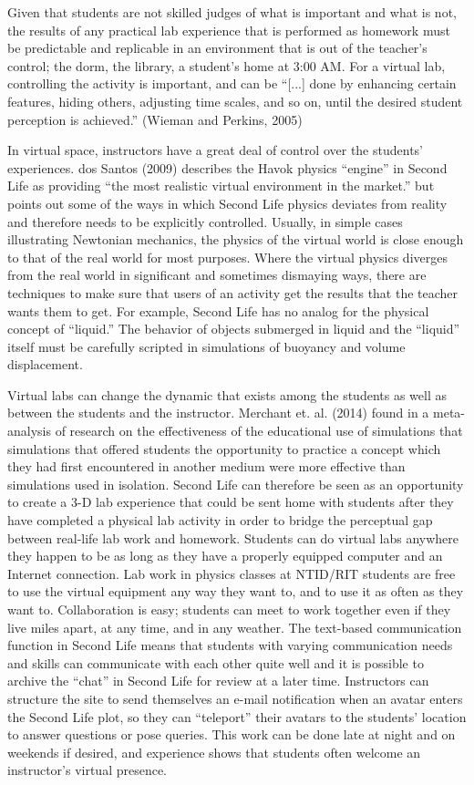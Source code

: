 \documentclass[11.5pt]{sig-alternate} %
\begin{document}
\begin{large}
Given that students are not skilled judges of what is important and what is not, the results of any practical lab experience that is performed as homework must be predictable and replicable in an environment that is out of the teacher’s control; the dorm, the library, a student’s home at 3:00 AM. For a virtual lab, controlling the activity is important, and can be “[...] done by enhancing certain features, hiding others, adjusting time scales, and so on, until the desired student perception is achieved.” (Wieman and Perkins, 2005)

In virtual space, instructors have a great deal of control over the students’ experiences. dos Santos (2009) describes the Havok physics “engine” in Second Life as providing “the most realistic virtual environment in the market.” but points out some of the ways in which Second Life physics deviates from reality and therefore needs to be explicitly controlled. Usually, in simple cases illustrating Newtonian mechanics, the physics of the virtual world is close enough to that of the real world for most purposes. Where the virtual physics diverges from the real world in significant and sometimes dismaying ways, there are techniques to make sure that users of an activity get the results that the teacher wants them to get. For example, Second Life has no analog for the physical concept of “liquid.” The behavior of objects submerged in liquid and the “liquid” itself must be carefully scripted in simulations of buoyancy and volume displacement.

Virtual labs can change the dynamic that exists among the students as well as between the students and the instructor. Merchant et. al. (2014) found in a meta-analysis of research on the effectiveness of the educational use of simulations that simulations that offered students the opportunity to practice a concept which they had first encountered in another medium were more effective than simulations used in isolation. Second Life can therefore be seen as an opportunity to create a 3-D lab experience that could be sent home with students after they have completed a physical lab activity in order to bridge the perceptual gap between real-life lab work and homework. Students can do virtual labs anywhere they happen to be as long as they have a properly equipped computer and an Internet connection. Lab work in physics classes at NTID/RIT students are free to use the virtual equipment any way they want to, and to use it as often as they want to. Collaboration is easy; students can meet to work together even if they live miles apart, at any time, and in any weather. The text-based communication function in Second Life means that students with varying communication needs and skills can communicate with each other quite well and it is possible to archive the “chat” in Second Life for review at a later time. Instructors can structure the site to send themselves an e-mail notification when an avatar enters the Second Life plot, so they can “teleport” their avatars to the students’ location to answer questions or pose queries. This work can be done late at night and on weekends if desired, and experience shows that students often welcome an instructor’s virtual presence.


\end{large}
\end{document}
